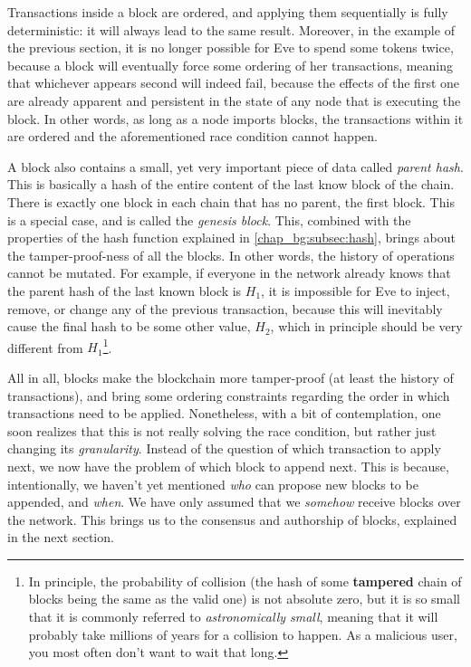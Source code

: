 Transactions inside a block are ordered, and applying them sequentially is fully deterministic: it
will always lead to the same result. Moreover, in the example of the previous section, it is no
longer possible for Eve to spend some tokens twice, because a block will eventually force some
ordering of her transactions, meaning that whichever appears second will indeed fail, because the
effects of the first one are already apparent and persistent in the state of any node that is
executing the block. In other words, as long as a node imports blocks, the transactions within it
are ordered and the aforementioned race condition cannot happen.

A block also contains a small, yet very important piece of data called \textit{parent hash}. This is
basically a hash of the entire content of the last know block of the chain. There is exactly one
block in each chain that has no parent, the first block. This is a special case, and is called the
\textit{genesis block}. This, combined with the properties of the hash function explained in
\ref{chap_bg:subsec:hash}, brings about the tamper-proof-ness of all the blocks. In other words, the
history of operations cannot be mutated. For example, if everyone in the network already knows that
the parent hash of the last known block is $H_1$, it is impossible for Eve to inject, remove, or
change any of the previous transaction, because this will inevitably cause the final hash to be some
other value, $H_2$, which in principle should be very different from $H_1$\footnote{In principle,
the probability of collision (the hash of some \textbf{tampered} chain of blocks being the same as
the valid one) is not absolute zero, but it is so small that it is commonly referred to
\textit{astronomically small}, meaning that it will probably take millions of years for a collision
to happen. As a malicious user, you most often don't want to wait that long.}.

All in all, blocks make the blockchain more tamper-proof (at least the history of transactions), and
bring some ordering constraints regarding the order in which transactions need to be applied.
Nonetheless, with a bit of contemplation, one soon realizes that this is not really solving the race
condition, but rather just changing its \textit{granularity}. Instead of the question of which
transaction to apply next, we now have the problem of which block to append next. This is because,
intentionally, we haven't yet mentioned \textit{who} can propose new blocks to be appended, and
\textit{when}. We have only assumed that we \textit{somehow} receive blocks over the network. This
brings us to the consensus and authorship of blocks, explained in the next section.

